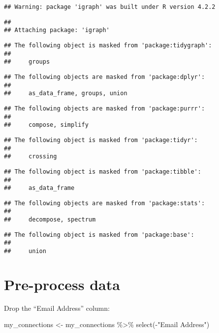 \documentclass[
]{article}
\newenvironment{Shaded}{\begin{snugshade}}{\end{snugshade}}
\newcommand{\FunctionTok}[1]{\textcolor[rgb]{0.00,0.00,0.00}{#1}}
\newcommand{\NormalTok}[1]{#1}
\newcommand{\OtherTok}[1]{\textcolor[rgb]{0.56,0.35,0.01}{#1}}
\newcommand{\SpecialCharTok}[1]{\textcolor[rgb]{0.00,0.00,0.00}{#1}}
\newcommand{\StringTok}[1]{\textcolor[rgb]{0.31,0.60,0.02}{#1}}
\begin{document}
\begin{verbatim}
## Warning: package 'igraph' was built under R version 4.2.2
\end{verbatim}

\begin{verbatim}
## 
## Attaching package: 'igraph'
\end{verbatim}

\begin{verbatim}
## The following object is masked from 'package:tidygraph':
## 
##     groups
\end{verbatim}

\begin{verbatim}
## The following objects are masked from 'package:dplyr':
## 
##     as_data_frame, groups, union
\end{verbatim}

\begin{verbatim}
## The following objects are masked from 'package:purrr':
## 
##     compose, simplify
\end{verbatim}

\begin{verbatim}
## The following object is masked from 'package:tidyr':
## 
##     crossing
\end{verbatim}

\begin{verbatim}
## The following object is masked from 'package:tibble':
## 
##     as_data_frame
\end{verbatim}

\begin{verbatim}
## The following objects are masked from 'package:stats':
## 
##     decompose, spectrum
\end{verbatim}

\begin{verbatim}
## The following object is masked from 'package:base':
## 
##     union
\end{verbatim}

\hypertarget{pre-process-data}{%
\section{Pre-process data}\label{pre-process-data}}

Drop the ``Email Address'' column:

\begin{Shaded}
\begin{Highlighting}[]
\NormalTok{my\_connections }\OtherTok{\textless{}{-}}\NormalTok{ my\_connections }\SpecialCharTok{\%\textgreater{}\%} \FunctionTok{select}\NormalTok{(}\SpecialCharTok{{-}}\StringTok{"Email Address"}\NormalTok{)}
\end{Highlighting}
\end{Shaded}
\end{document}
